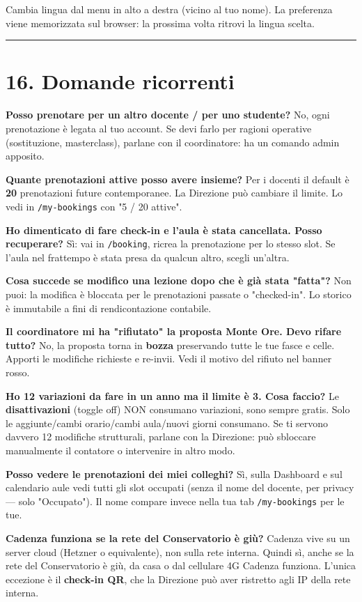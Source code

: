 \documentclass[11pt,a4paper]{article}
\begin{document}
Cambia lingua dal menu in alto a destra (vicino al tuo nome). La preferenza viene memorizzata sul browser: la prossima volta ritrovi la lingua scelta.

\medskip\hrule\medskip

\section{16. Domande ricorrenti}


\textbf{Posso prenotare per un altro docente / per uno studente?} No, ogni prenotazione è legata al tuo account. Se devi farlo per ragioni operative (sostituzione, masterclass), parlane con il coordinatore: ha un comando admin apposito.

\textbf{Quante prenotazioni attive posso avere insieme?} Per i docenti il default è \textbf{20} prenotazioni future contemporanee. La Direzione può cambiare il limite. Lo vedi in \texttt{/my-bookings} con "5 / 20 attive".

\textbf{Ho dimenticato di fare check-in e l'aula è stata cancellata. Posso recuperare?} Sì: vai in \texttt{/booking}, ricrea la prenotazione per lo stesso slot. Se l'aula nel frattempo è stata presa da qualcun altro, scegli un'altra.

\textbf{Cosa succede se modifico una lezione dopo che è già stata "fatta"?} Non puoi: la modifica è bloccata per le prenotazioni passate o "checked-in". Lo storico è immutabile a fini di rendicontazione contabile.

\textbf{Il coordinatore mi ha "rifiutato" la proposta Monte Ore. Devo rifare tutto?} No, la proposta torna in \textbf{bozza} preservando tutte le tue fasce e celle. Apporti le modifiche richieste e re-invii. Vedi il motivo del rifiuto nel banner rosso.

\textbf{Ho 12 variazioni da fare in un anno ma il limite è 3. Cosa faccio?} Le \textbf{disattivazioni} (toggle off) NON consumano variazioni, sono sempre gratis. Solo le aggiunte/cambi orario/cambi aula/nuovi giorni consumano. Se ti servono davvero 12 modifiche strutturali, parlane con la Direzione: può sbloccare manualmente il contatore o intervenire in altro modo.

\textbf{Posso vedere le prenotazioni dei miei colleghi?} Sì, sulla Dashboard e sul calendario aule vedi tutti gli slot occupati (senza il nome del docente, per privacy --- solo "Occupato"). Il nome compare invece nella tua tab \texttt{/my-bookings} per le tue.

\textbf{Cadenza funziona se la rete del Conservatorio è giù?} Cadenza vive su un server cloud (Hetzner o equivalente), non sulla rete interna. Quindi sì, anche se la rete del Conservatorio è giù, da casa o dal cellulare 4G Cadenza funziona. L'unica eccezione è il \textbf{check-in QR}, che la Direzione può aver ristretto agli IP della rete interna.
\end{document}
